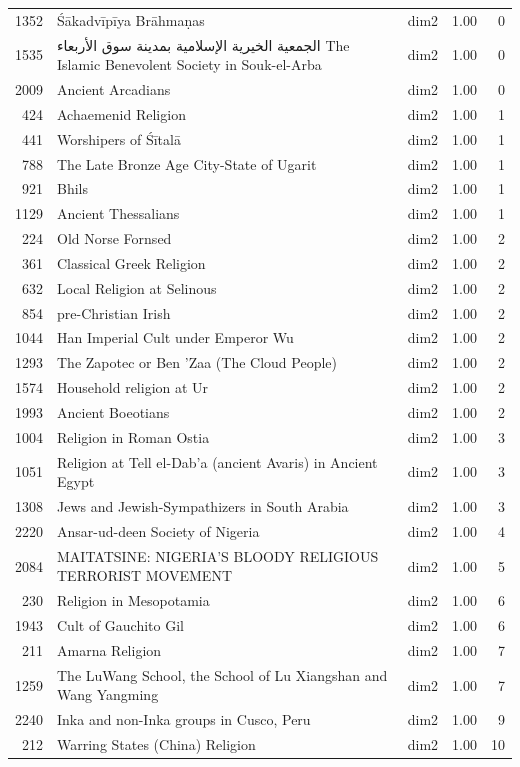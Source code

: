 \begin{tabular}{rllrr}
1352 & Śākadvīpīya Brāhmaṇas & dim2 & 1.00 & 0 \\
1535 & الجمعية الخيرية الإسلامية بمدينة سوق الأربعاء The Islamic Benevolent Society in Souk-el-Arba & dim2 & 1.00 & 0 \\
2009 & Ancient Arcadians & dim2 & 1.00 & 0 \\
424 & Achaemenid Religion & dim2 & 1.00 & 1 \\
441 & Worshipers of Śītalā & dim2 & 1.00 & 1 \\
788 & The Late Bronze Age City-State of Ugarit & dim2 & 1.00 & 1 \\
921 & Bhils & dim2 & 1.00 & 1 \\
1129 & Ancient Thessalians & dim2 & 1.00 & 1 \\
224 & Old Norse Fornsed & dim2 & 1.00 & 2 \\
361 & Classical Greek Religion & dim2 & 1.00 & 2 \\
632 & Local Religion at Selinous & dim2 & 1.00 & 2 \\
854 & pre-Christian Irish & dim2 & 1.00 & 2 \\
1044 & Han Imperial Cult under Emperor Wu & dim2 & 1.00 & 2 \\
1293 & The Zapotec or Ben 'Zaa (The Cloud People) & dim2 & 1.00 & 2 \\
1574 & Household religion at Ur & dim2 & 1.00 & 2 \\
1993 & Ancient Boeotians & dim2 & 1.00 & 2 \\
1004 & Religion in Roman Ostia & dim2 & 1.00 & 3 \\
1051 & Religion at Tell el-Dab'a (ancient Avaris) in Ancient Egypt & dim2 & 1.00 & 3 \\
1308 & Jews and Jewish-Sympathizers in South Arabia & dim2 & 1.00 & 3 \\
2220 & Ansar-ud-deen Society of Nigeria & dim2 & 1.00 & 4 \\
2084 & MAITATSINE: NIGERIA'S BLOODY RELIGIOUS TERRORIST MOVEMENT & dim2 & 1.00 & 5 \\
230 & Religion in Mesopotamia & dim2 & 1.00 & 6 \\
1943 & Cult of Gauchito Gil & dim2 & 1.00 & 6 \\
211 & Amarna Religion & dim2 & 1.00 & 7 \\
1259 & The LuWang School, the School of Lu Xiangshan and Wang Yangming & dim2 & 1.00 & 7 \\
2240 & Inka and non-Inka groups in Cusco, Peru & dim2 & 1.00 & 9 \\
212 & Warring States (China) Religion & dim2 & 1.00 & 10 \\

\end{tabular}
